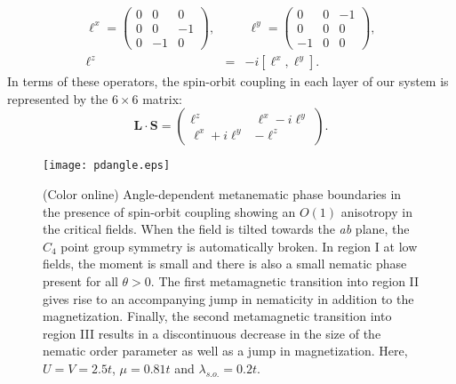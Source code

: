 \documentclass[prb,aps,amssymb,showpacs,twocolumn,amsmath,floatfix]{revtex4}
\begin{document}
\begin{eqnarray}
\ell^x = \left( \begin{array}{ccc}
0 & 0 & 0 \\
0 & 0 & -1 \\
0 & -1 & 0 \end{array} \right), && \ 
\ell^y = \left( \begin{array}{ccc}
0 & 0 & -1 \\
0 & 0 & 0 \\
-1 & 0 & 0 \end{array} \right), \nonumber \\
 \ell^z &=& -i \left[ \ell^x, \ell^y \right] . 
\end{eqnarray}
In terms of these operators, the spin-orbit coupling in each layer of our system is represented by the $6 \times 6$ matrix:
\begin{equation}
\bm L \cdot \bm S = \left( \begin{array}{cc}
 \ell^z & \ell^x - i \ell^y \\
 \ell^x + i \ell^y  & - \ell^z \end{array}\right) . 
 \end{equation}

\begin{figure}
\texttt{[image: pdangle.eps]}
\caption{ (Color online) Angle-dependent metanematic phase boundaries  
in the presence of spin-orbit coupling showing an $O(1)$ anisotropy in the critical fields.  
When the field is tilted towards the {\it ab} plane, the $C_4$ point group symmetry is 
automatically broken.  In region I at low fields, the moment is small and there is also a small 
nematic phase present for all $\theta > 0$.  The first metamagnetic transition into region II gives rise to an 
accompanying jump in nematicity in addition to the magnetization.  Finally, the second metamagnetic 
transition into region III results in a discontinuous decrease in the size of the nematic order parameter 
as well as a jump in magnetization.  
Here, $U=V=2.5t$, $\mu = 0.81t$ and $\lambda_{s.o.} = 0.2t$.    }
   \label{angle}
\end{figure} 
\end{document}
